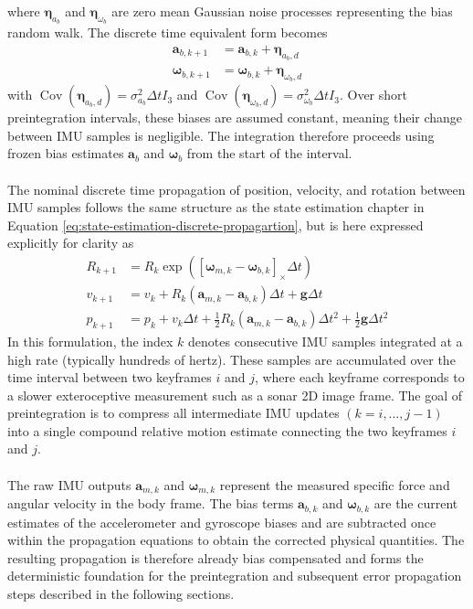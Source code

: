 where $\boldsymbol{\eta}_{a_b}$ and $\boldsymbol{\eta}_{\omega_b}$ are zero mean Gaussian noise processes representing the bias random walk. The discrete time equivalent form becomes
\begin{equation}
    \begin{aligned}
        \mathbf{a}_{b,k+1} &= \mathbf{a}_{b,k} + \boldsymbol{\eta}_{a_b,d} \\
        \boldsymbol{\omega}_{b,k+1} &= \boldsymbol{\omega}_{b,k} + \boldsymbol{\eta}_{\omega_b,d}
    \end{aligned}
    \label{eq:preintegration-bias-propagartion}
\end{equation}
with $\operatorname{Cov}(\boldsymbol{\eta}_{a_b,d}) = \sigma_{a_b}^2 \Delta t I_3$ and $\operatorname{Cov}(\boldsymbol{\eta}_{\omega_b,d}) = \sigma_{\omega_b}^2 \Delta t I_3$. Over short preintegration intervals, these biases are assumed constant, meaning their change between IMU samples is negligible. The integration therefore proceeds using frozen bias estimates $\mathbf{a}_b$ and $\boldsymbol{\omega}_b$ from the start of the interval.
\\ \\
The nominal discrete time propagation of position, velocity, and rotation between IMU samples follows the same structure as the state estimation chapter in Equation \ref{eq:state-estimation-discrete-propagartion}, but is here expressed explicitly for clarity as
$$
    \begin{aligned}
        R_{k+1} &= R_k \exp([\boldsymbol{\omega}_{m,k} - \boldsymbol{\omega}_{b,k}]_\times \Delta t) \\
        v_{k+1} &= v_k + R_k(\mathbf{a}_{m,k} - \mathbf{a}_{b,k})\Delta t + \mathbf{g}\Delta t \\
        p_{k+1} &= p_k + v_k\Delta t + \tfrac{1}{2}R_k(\mathbf{a}_{m,k} - \mathbf{a}_{b,k})\Delta t^2 + \tfrac{1}{2}\mathbf{g}\Delta t^2
    \end{aligned}
$$
In this formulation, the index $k$ denotes consecutive IMU samples integrated at a high rate (typically hundreds of hertz). These samples are accumulated over the time interval between two keyframes $i$ and $j$, where each keyframe corresponds to a slower exteroceptive measurement such as a sonar 2D image frame. The goal of preintegration is to compress all intermediate IMU updates $(k=i, \ldots, j-1)$ into a single compound relative motion estimate connecting the two keyframes $i$ and $j$. 
\\ \\
The raw IMU outputs $\mathbf{a}_{m,k}$ and $\boldsymbol{\omega}_{m,k}$ represent the measured specific force and angular velocity in the body frame. The bias terms $\mathbf{a}_{b,k}$ and $\boldsymbol{\omega}_{b,k}$ are the current estimates of the accelerometer and gyroscope biases and are subtracted once within the propagation equations to obtain the corrected physical quantities. The resulting propagation is therefore already bias compensated and forms the deterministic foundation for the preintegration and subsequent error propagation steps described in the following sections.
